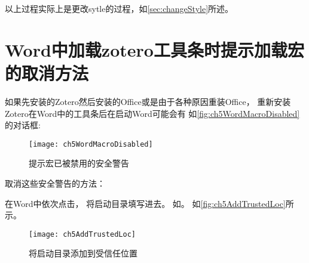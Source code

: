 \documentclass[theorem=false,mathfont=none,openany,sub3section]{easybook}
\begin{document}
{以上过程实际上是更改sytle的过程，如\cref{sec:changeStyle}所述。

\section{Word中加载zotero工具条时提示加载宏的取消方法}\label{sec:load_mac}
如果先安装的Zotero然后安装的Office或是由于各种原因重装Office，
重新安装Zotero在Word中的工具条后在启动Word可能会有
如\autoref{fig:ch5WordMacroDisabled}的对话框:
\begin{figure}[htbp]
	\centering
	\texttt{[image: ch5WordMacroDisabled]}
	\caption{提示宏已被禁用的安全警告}
	\label{fig:ch5WordMacroDisabled}
	\end{figure}
	
	取消这些安全警告的方法：
	
	在Word中依次点击，
	将启动目录填写进去。    	
	如。
	如\autoref{fig:ch5AddTrustedLoc}所示。
	\begin{figure}[ht]
\centering
\texttt{[image: ch5AddTrustedLoc]}
\caption{将启动目录添加到受信任位置}
\label{fig:ch5AddTrustedLoc}
\end{figure}

%	
%	

}
\end{document}
